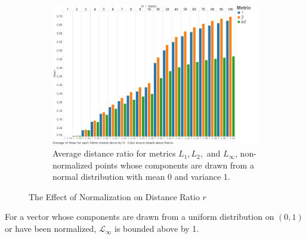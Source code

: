 \documentclass{article}
\begin{document}
\begin{figure}[H]
\centering
   \ContinuedFloat 
\begin{subfigure}[h]{0.75\textwidth}
        \includegraphics[width=1\textwidth]{exp2without_normalization.png}
        \caption{Average distance ratio for metrics $L_1,L_2,$ and $L_{\infty}$, non-normalized points whose components are drawn from a normal distribution with mean 0 and variance 1.}
        \label{fig:no_normalization}
        \end{subfigure}
        \caption{The Effect of Normalization on Distance Ratio $r$}
\end{figure}

For a vector whose components are drawn from a uniform distribution on $(0, 1)$ or have been normalized, $\mathcal{L}_{\infty}$ is bounded above by 1.
\end{document}
